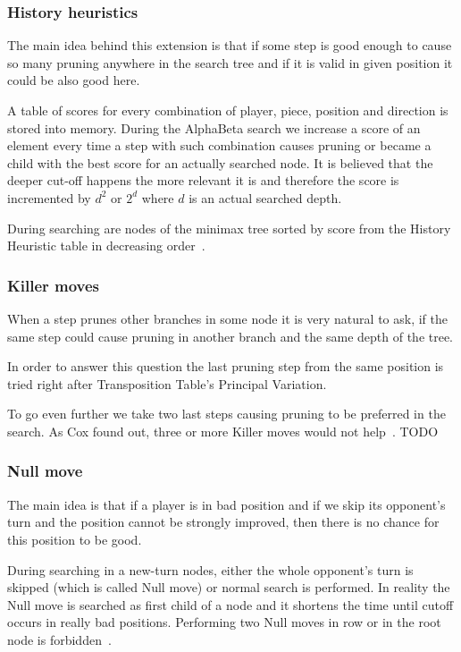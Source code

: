 	\subsubsection{History heuristics}
	The main idea behind this extension is that if some step is good enough
	to cause so many pruning anywhere in the search tree and if it is valid in
	given position it could be also good here.

	A table of scores for every combination of player, piece, position and
	direction is stored into memory. During the AlphaBeta search we increase a
	score of an element every time a step with such combination causes pruning
	or became a child with the best score for an actually searched node. It is
	believed that the deeper cut-off happens the more relevant it is and
	therefore the score is incremented by $d^2$ or $2^d$ where $d$ is an actual
	searched depth.

	During searching are nodes of the minimax tree sorted by score from the
	History Heuristic table in decreasing order~\cite{COX}.

	\subsubsection{Killer moves}
	When a step prunes other branches in some node it is very natural to ask,
	if the same step could cause pruning in another branch and the same depth
	of the tree.
	
	In order to answer this question the last pruning step from the same
	position is tried right after Transposition Table's Principal Variation.
	
	To go even further we take two last steps causing pruning to be
	preferred in the search. As Cox found out, three or more Killer moves
	would not help~\cite{COX}. TODO

	\subsubsection{Null move}
	The main idea is that if a player is in bad position and if we skip its
	opponent's turn and the position cannot be strongly improved, then there is
	no chance for this position to be good.

	During searching in a new-turn nodes, either the whole opponent's turn is
	skipped (which is called Null move) or normal search is performed. In
	reality the Null move is searched as first child of a node and it shortens
	the time until cutoff occurs in really bad positions. Performing two Null
	moves in row or in the root node is forbidden~\cite{COX}.


